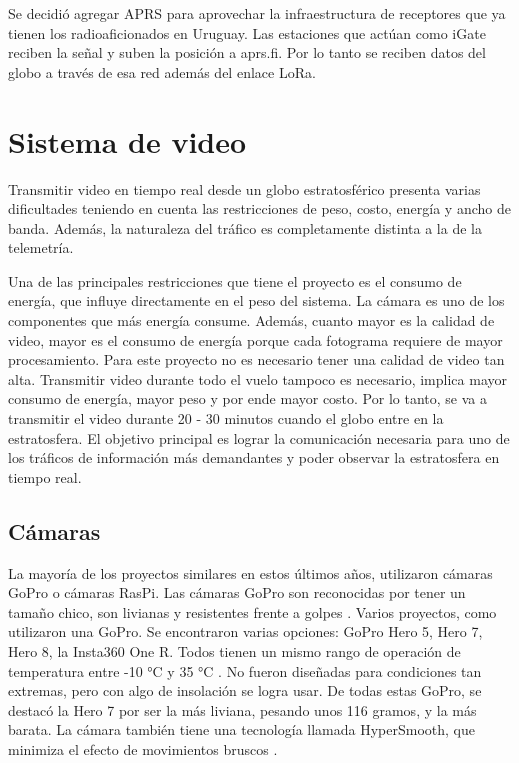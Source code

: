 \documentclass[12pt,a4paper]{article}
\begin{document}
Se decidió agregar APRS para aprovechar la infraestructura de receptores que ya tienen los radioaficionados en Uruguay. Las estaciones que actúan como iGate reciben la señal y suben la posición a aprs.fi. Por lo tanto se reciben datos del globo a través de esa red además del enlace LoRa.

\section{Sistema de video}\label{video}


Transmitir video en tiempo real desde un globo estratosférico presenta varias dificultades teniendo en cuenta las restricciones de peso, costo, energía y ancho de banda. Además, la naturaleza del tráfico es completamente distinta a la de la telemetría.

Una de las principales restricciones que tiene el proyecto es el consumo de energía, que influye directamente en el peso del sistema. La cámara es uno de los componentes que más energía consume. Además, cuanto mayor es la calidad de video, mayor es el consumo de energía porque cada fotograma requiere de mayor procesamiento. Para este proyecto no es necesario tener una calidad de video tan alta. Transmitir video durante todo el vuelo tampoco es necesario, implica mayor consumo de energía, mayor peso y por ende mayor costo. Por lo tanto, se va a transmitir el video durante 20 - 30 minutos cuando el globo entre en la estratosfera. El objetivo principal es lograr la comunicación necesaria para uno de los tráficos de información más demandantes y poder observar la estratosfera en tiempo real.

\subsection{Cámaras}\label{cuxe1maras}

La mayoría de los proyectos similares en estos últimos años, utilizaron cámaras GoPro o cámaras RasPi. Las cámaras GoPro son reconocidas por tener un tamaño chico, son livianas y resistentes frente a golpes \cite{ref14}. Varios proyectos, como \cite{ref16,ref18,ref19,ref20,ref33} utilizaron una GoPro. Se encontraron varias opciones: GoPro Hero 5, Hero 7, Hero 8, la Insta360 One R. Todos tienen un mismo rango de operación de temperatura entre -10 °C y 35 °C \cite{ref14}. No fueron diseñadas para condiciones tan extremas, pero con algo de insolación se logra usar. De todas estas GoPro, se destacó la Hero 7 por ser la más liviana, pesando unos 116 gramos, y la más barata. La cámara también tiene una tecnología llamada HyperSmooth, que minimiza el efecto de movimientos bruscos \cite{ref15}.
\end{document}
